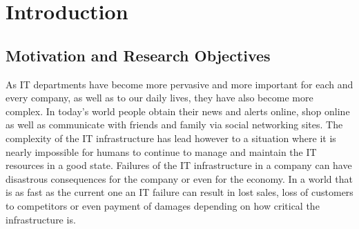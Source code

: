 
\chapter{Introduction} %
\label{Chapter_introduction}

\section{Motivation and Research Objectives}

As IT departments have become more pervasive and more important for each and every company, as well as to our daily lives, they have also become more complex. In today's world people obtain their news and alerts online, shop online as well as communicate with friends and family via social networking sites. The complexity of the IT infrastructure has lead however to a situation where it is nearly impossible for humans to continue to manage and maintain the IT resources in a good state. Failures of the IT infrastructure in a company can have disastrous consequences for the company or even for the economy. In a world that is as fast as the current one an IT failure can result in lost sales, loss of customers to competitors or even payment of damages depending on how critical the infrastructure is.


